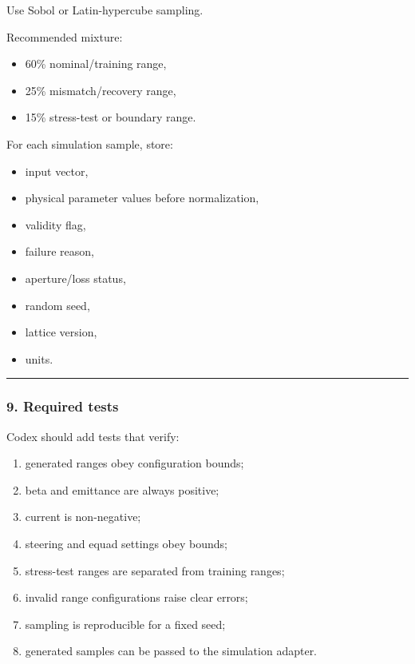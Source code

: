 \documentclass[
]{article}
\providecommand{\tightlist}{%
  \setlength{\itemsep}{0pt}\setlength{\parskip}{0pt}}
\begin{document}
Use Sobol or Latin-hypercube sampling.

Recommended mixture:

\begin{itemize}
\tightlist
\item
  60\% nominal/training range,
\item
  25\% mismatch/recovery range,
\item
  15\% stress-test or boundary range.
\end{itemize}

For each simulation sample, store:

\begin{itemize}
\tightlist
\item
  input vector,
\item
  physical parameter values before normalization,
\item
  validity flag,
\item
  failure reason,
\item
  aperture/loss status,
\item
  random seed,
\item
  lattice version,
\item
  units.
\end{itemize}

\begin{center}\rule{0.5\linewidth}{0.5pt}\end{center}

\hypertarget{required-tests-2}{%
\subsubsection{9. Required tests}\label{required-tests-2}}

Codex should add tests that verify:

\begin{enumerate}
\def\labelenumi{\arabic{enumi}.}
\tightlist
\item
  generated ranges obey configuration bounds;
\item
  beta and emittance are always positive;
\item
  current is non-negative;
\item
  steering and equad settings obey bounds;
\item
  stress-test ranges are separated from training ranges;
\item
  invalid range configurations raise clear errors;
\item
  sampling is reproducible for a fixed seed;
\item
  generated samples can be passed to the simulation adapter.
\end{enumerate}
\end{document}
